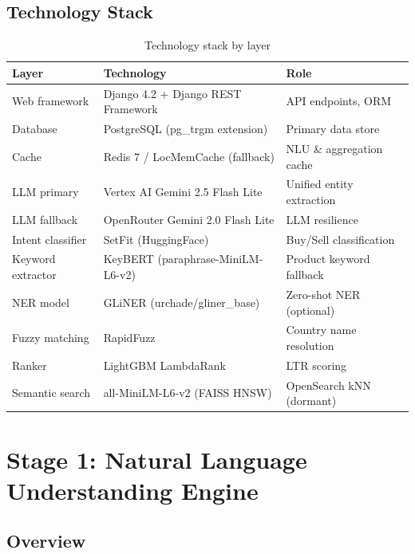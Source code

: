 \documentclass[12pt,a4paper]{article}
\begin{document}
\subsection{Technology Stack}

\begin{table}[H]
\centering
\renewcommand{\arraystretch}{1.3}
\begin{tabularx}{\textwidth}{lXl}
\toprule
\rowcolor{tableheader!20}
\textbf{Layer} & \textbf{Technology} & \textbf{Role} \\
\midrule
Web framework      & Django 4.2 + Django REST Framework   & API endpoints, ORM \\
Database           & PostgreSQL (pg\_trgm extension)       & Primary data store \\
Cache              & Redis 7 / LocMemCache (fallback)      & NLU \& aggregation cache \\
LLM primary        & Vertex AI Gemini 2.5 Flash Lite       & Unified entity extraction \\
LLM fallback       & OpenRouter Gemini 2.0 Flash Lite      & LLM resilience \\
Intent classifier  & SetFit (HuggingFace)                  & Buy/Sell classification \\
Keyword extractor  & KeyBERT (paraphrase-MiniLM-L6-v2)    & Product keyword fallback \\
NER model          & GLiNER (urchade/gliner\_base)         & Zero-shot NER (optional) \\
Fuzzy matching     & RapidFuzz                             & Country name resolution \\
Ranker             & LightGBM LambdaRank                   & LTR scoring \\
Semantic search    & all-MiniLM-L6-v2 (FAISS HNSW)        & OpenSearch kNN (dormant) \\
\bottomrule
\end{tabularx}
\caption{Technology stack by layer}
\end{table}

\newpage
\section{Stage 1: Natural Language Understanding Engine}
\label{sec:nlu}

\subsection{Overview}
\end{document}
